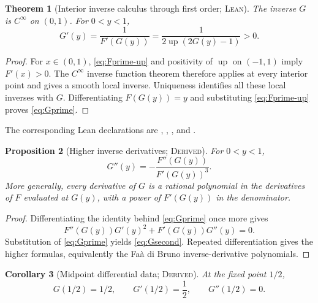 \documentclass[11pt,oneside]{article}
\newtheorem{theorem}{Theorem}[section]
\newtheorem{proposition}[theorem]{Proposition}
\newtheorem{corollary}[theorem]{Corollary}
\theoremstyle{definition}
\theoremstyle{remark}
\newcommand{\Up}{\operatorname{up}}
\newcommand{\InvF}{G}
\newcommand{\Formalized}{\textsc{Lean}}
\newcommand{\Derived}{\textsc{Derived}}
\begin{document}
\begin{theorem}[Interior inverse calculus through first order; \Formalized]
\label{thm:inverse-calculus}
The inverse $\InvF$ is $C^\infty$ on $(0,1)$.  For $0<y<1$,
\begin{equation}
 \InvF'(y)
   =\frac1{F'(\InvF(y))}
     =\frac1{2\Up(2\InvF(y)-1)}>0.
 \label{eq:Gprime}
\end{equation}
\end{theorem}

\begin{proof}
For $x\in(0,1)$, \eqref{eq:Fprime-up} and positivity of $\Up$ on
$(-1,1)$ imply $F'(x)>0$.  The $C^\infty$ inverse function theorem
therefore applies at every interior point and gives a smooth local inverse.
Uniqueness identifies all these local inverses with $\InvF$.  Differentiating
$F(\InvF(y))=y$ and substituting \eqref{eq:Fprime-up} proves
\eqref{eq:Gprime}.
\end{proof}

The corresponding Lean declarations are ,
,
, and
.

\begin{proposition}[Higher inverse derivatives; \Derived]
\label{prop:inverse-higher-derivatives}
For $0<y<1$,
\begin{equation}
 \InvF''(y)
   =-\frac{F''(\InvF(y))}
           {F'(\InvF(y))^3}.
 \label{eq:Gsecond}
\end{equation}
More generally, every derivative of $\InvF$ is a rational polynomial in
the derivatives of $F$ evaluated at $\InvF(y)$, with a power of
$F'(\InvF(y))$ in the denominator.
\end{proposition}

\begin{proof}
Differentiating the identity behind \eqref{eq:Gprime} once more gives
\[
 F''(\InvF(y))\InvF'(y)^2+
 F'(\InvF(y))\InvF''(y)=0.
\]
Substitution of \eqref{eq:Gprime} yields \eqref{eq:Gsecond}.  Repeated
differentiation gives the higher formulas, equivalently the
Fa\`a di Bruno inverse-derivative polynomials.
\end{proof}

\begin{corollary}[Midpoint differential data; \Derived]
\label{cor:midpoint-inverse}
At the fixed point $1/2$,
\[
 \InvF(1/2)=1/2,\qquad
 \InvF'(1/2)=\frac12,\qquad
 \InvF''(1/2)=0.
\]
\end{corollary}
\end{document}
